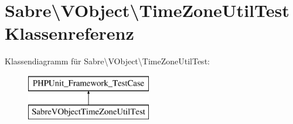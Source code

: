 \hypertarget{class_sabre_1_1_v_object_1_1_time_zone_util_test}{}\section{Sabre\textbackslash{}V\+Object\textbackslash{}Time\+Zone\+Util\+Test Klassenreferenz}
\label{class_sabre_1_1_v_object_1_1_time_zone_util_test}
Klassendiagramm für Sabre\textbackslash{}V\+Object\textbackslash{}Time\+Zone\+Util\+Test\+:\begin{figure}[H]
\begin{center}
\leavevmode
\includegraphics[height=2.000000cm]{class_sabre_1_1_v_object_1_1_time_zone_util_test}
\end{center}
\end{figure}
